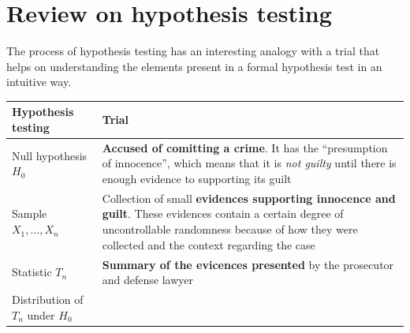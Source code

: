 \documentclass[]{book}
\theoremstyle{definition}
\theoremstyle{definition}
\theoremstyle{definition}
\theoremstyle{remark}
\begin{document}
\chapter{Review on hypothesis testing}\label{app-ht}

The process of hypothesis testing has an interesting analogy with a
trial that helps on understanding the elements present in a formal
hypothesis test in an intuitive way.

\begin{longtable}[]{@{}ll@{}}
\toprule
\begin{minipage}[b]{0.38\columnwidth}\raggedright\strut
Hypothesis testing\strut
\end{minipage} & \begin{minipage}[b]{0.56\columnwidth}\raggedright\strut
Trial\strut
\end{minipage}\tabularnewline
\midrule
\endhead
\begin{minipage}[t]{0.38\columnwidth}\raggedright\strut
Null hypothesis \(H_0\)\strut
\end{minipage} & \begin{minipage}[t]{0.56\columnwidth}\raggedright\strut
\textbf{Accused of comitting a crime}. It has the ``presumption of
innocence'', which means that it is \emph{not guilty} until there is
enough evidence to supporting its guilt\strut
\end{minipage}\tabularnewline
\begin{minipage}[t]{0.38\columnwidth}\raggedright\strut
Sample \(X_1,\ldots,X_n\)\strut
\end{minipage} & \begin{minipage}[t]{0.56\columnwidth}\raggedright\strut
Collection of small \textbf{evidences supporting innocence and guilt}.
These evidences contain a certain degree of uncontrollable randomness
because of how they were collected and the context regarding the
case\strut
\end{minipage}\tabularnewline
\begin{minipage}[t]{0.38\columnwidth}\raggedright\strut
Statistic \(T_n\)\strut
\end{minipage} & \begin{minipage}[t]{0.56\columnwidth}\raggedright\strut
\textbf{Summary of the evicences presented} by the prosecutor and
defense lawyer\strut
\end{minipage}\tabularnewline
\begin{minipage}[t]{0.38\columnwidth}\raggedright\strut
Distribution of \(T_n\) under \(H_0\)\strut
\end{minipage} & \begin{minipage}[t]{0.56\columnwidth}\raggedright\strut

\end{minipage}
\end{longtable}
\end{document}
